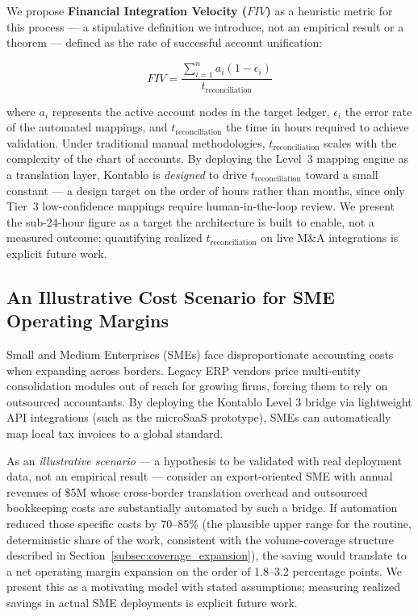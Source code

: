 We propose \textbf{Financial Integration Velocity ($FIV$)} as a heuristic metric for this process --- a stipulative definition we introduce, not an empirical result or a theorem --- defined as the rate of successful account unification:

\begin{equation}\label{eq:fiv}
FIV = \frac{\sum_{i=1}^{n} a_i(1 - \epsilon_i)}{t_{\text{reconciliation}}}
\end{equation}

where $a_i$ represents the active account nodes in the target ledger, $\epsilon_i$ the error rate of the automated mappings, and $t_{\text{reconciliation}}$ the time in hours required to achieve validation. Under traditional manual methodologies, $t_{\text{reconciliation}}$ scales with the complexity of the chart of accounts. By deploying the Level~3 mapping engine as a translation layer, Kontablo is \emph{designed} to drive $t_{\text{reconciliation}}$ toward a small constant --- a design target on the order of hours rather than months, since only Tier~3 low-confidence mappings require human-in-the-loop review. We present the sub-24-hour figure as a target the architecture is built to enable, not a measured outcome; quantifying realized $t_{\text{reconciliation}}$ on live M\&A integrations is explicit future work.

\subsection{An Illustrative Cost Scenario for SME Operating Margins}
Small and Medium Enterprises (SMEs) face disproportionate accounting costs when expanding across borders. Legacy ERP vendors price multi-entity consolidation modules out of reach for growing firms, forcing them to rely on outsourced accountants. By deploying the Kontablo Level 3 bridge via lightweight API integrations (such as the microSaaS prototype), SMEs can automatically map local tax invoices to a global standard.

As an \emph{illustrative scenario} --- a hypothesis to be validated with real deployment data, not an empirical result --- consider an export-oriented SME with annual revenues of \$5M whose cross-border translation overhead and outsourced bookkeeping costs are substantially automated by such a bridge. If automation reduced those specific costs by 70--85\% (the plausible upper range for the routine, deterministic share of the work, consistent with the volume-coverage structure described in Section~\ref{subsec:coverage_expansion}), the saving would translate to a net operating margin expansion on the order of 1.8--3.2 percentage points. We present this as a motivating model with stated assumptions; measuring realized savings in actual SME deployments is explicit future work.

